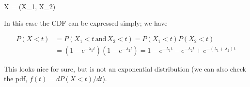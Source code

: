 \bee
X = \max (X_1, X_2)
\eee 

In this case the CDF can be expressed simply; we have

\begin{align*}
P(X < t) &= P( X_1 < t \, \text{and} \, X_2 < t) = P(X_1 < t) P(X_2 < t) \\
&= (1-e^{-\lambda_1 t})(1-e^{-\lambda_2 t}) = 1 - e^{-\lambda_1 t} - e^{-\lambda_2 t} + e^{-(\lambda_1 + \lambda_2)t}
\end{align*}

This looks nice for sure, but is not an exponential distribution (we can also check the pdf, $f(t) = dP(X<t) / dt$).





